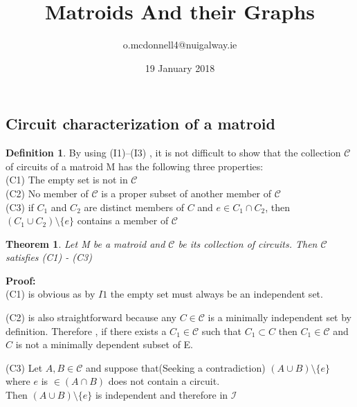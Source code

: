 \documentclass{article}
\title{Matroids And their Graphs}
\author{o.mcdonnell4@nuigalway.ie }
\date{19 January 2018}
\theoremstyle{plain}
\newtheorem{thm}{Theorem}[section]
\theoremstyle{definition}
\newtheorem{defn}{Definition}[section]
\theoremstyle{remark}
\newcommand\Proof{%
    \textbf{Proof:}~%
}
\begin{document}
\maketitle
 
\subsection{Circuit characterization of a matroid}

\begin{defn} By using (I1)–(I3) , it is not difficult to show that the collection $\mathcal{C}$ of circuits of a matroid M has the following three properties:\\
(C1) The empty set is not in $\mathcal{C}$\\
(C2) No member of $\mathcal{C}$ is a proper subset of another member of $\mathcal{C}$\\
(C3) if $ C_1 $ and $ C_2 $ are distinct members of $ C $ and 
$ e \in C_1 \cap C_2 $, then $ (C_1 \cup C_2 ) \setminus \{e\} $ contains a member of $\mathcal{C}$ 
 \end{defn}
 
 \vspace{5mm}
 
 \begin{thm}
 Let M be a matroid and $\mathcal{C}$ be its collection of circuits. Then $\mathcal{C}$ satisfies (C1) - (C3)
  \end{thm}
 
 \noindent\textbf\Proof \\
 \noindent (C1) is obvious as by $I1$ the empty set must always be an independent set.
 
 \vspace{2mm}
 
 \noindent (C2) is also straightforward because any $ C \in \mathcal{C} $ is a minimally independent set by definition. Therefore , if there exists a $ C_1 \in \mathcal{C} $ such that $ C_1 \subset C $ then $ C_1 \in \mathcal{C} $ and $ C $ is not a minimally dependent subset of E. 
 
 \vspace{2mm}
 
 \noindent (C3) Let $ A, B \in \mathcal{C} $ and suppose that(Seeking a contradiction) $ (A \cup B) \setminus \{e\} $ where $ e $ is $ \in (A \cap B) $ does not contain a circuit.\\
 \noindent Then $ (A \cup B) \setminus \{e\} $ is independent and therefore in $\mathcal{I}$
 
\end{document}
